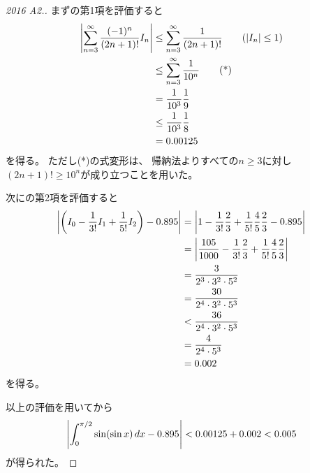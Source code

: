 \documentclass[report]{jlreq}
\begin{document}
\begin{proof}[2016 A2.]
    まずの第1項を評価すると
    \begin{alignat}{1}
        \left|{
            \sum_{n = 3}^\infty
                \frac{(-1)^n}{(2n + 1)!}
                I_n
        }\right|
            &\le
                \sum_{n = 3}^\infty
                    \frac{1}{(2n + 1)!}
                \qquad
                (|I_n| \le 1)
                \\
            &\le
                \sum_{n = 3}^\infty
                    \frac{1}{10^n}
                \qquad
                (\text{*})
                \\
            &=
                \frac{1}{10^3} \frac{1}{9}
                \\
            &\le
                \frac{1}{10^3}
                \frac{1}{8}
                \\
            &=
                0.00125
    \end{alignat}
    を得る。
    ただし(*)の式変形は、
    帰納法よりすべての$n \ge 3$に対し
    $(2n + 1)! \ge 10^n$が成り立つことを用いた。

    次にの第2項を評価すると
    \begin{alignat}{1}
        \left|{
            \left({
                I_0 - \frac{1}{3!} I_1 + \frac{1}{5!} I_2
            }\right)
            -
            0.895
        }\right|
            &=
                \left|{
                    1 - \frac{1}{3!} \frac{2}{3} + \frac{1}{5!} \frac{4}{5} \frac{2}{3}
                    -
                    0.895
                }\right|
                \\
            &=
                \left|{
                    \frac{105}{1000}
                    - \frac{1}{3!} \frac{2}{3} + \frac{1}{5!} \frac{4}{5} \frac{2}{3}
                }\right|
                \\
            &=
                \frac{3}{2^3 \cdot 3^2 \cdot 5^2}
                \\
            &=
                \frac{30}{2^4 \cdot 3^2 \cdot 5^3}
                \\
            &<
                \frac{36}{2^4 \cdot 3^2 \cdot 5^3}
                \\
            &=
                \frac{4}{2^4 \cdot 5^3}
                \\
            &=
                0.002
    \end{alignat}
    を得る。

    以上の評価を用いてから
    \begin{equation}
        \left|{
            \int_0^{\pi / 2}
                \sin (\sin x)
                \, dx
            -
            0.895
        }\right|
            < 0.00125 + 0.002
            < 0.005
    \end{equation}
    が得られた。
\end{proof}
\end{document}
